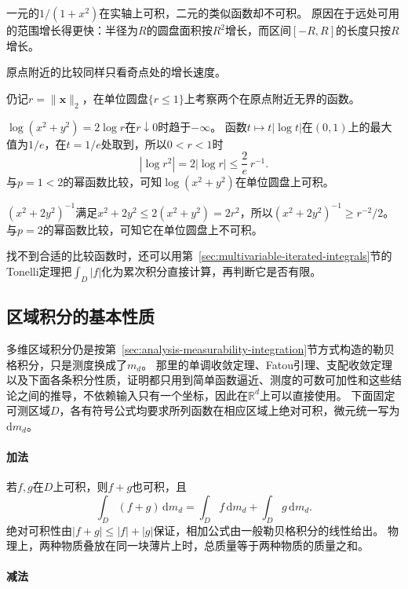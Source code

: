 一元的$1/(1+x^2)$在实轴上可积，二元的类似函数却不可积。
原因在于远处可用的范围增长得更快：半径为$R$的圆盘面积按$R^2$增长，而区间$[-R,R]$的长度只按$R$增长。

原点附近的比较同样只看奇点处的增长速度。
\begin{example}[原点附近的对数奇点与平方倒数奇点]
\label{ex:region-comparison-near-origin}
仍记$r=\lVert\bm x\rVert_2$，在单位圆盘$\{r\leq1\}$上考察两个在原点附近无界的函数。

$\log(x^2+y^2)=2\log r$在$r\downarrow0$时趋于$-\infty$。
函数$t\mapsto t|\log t|$在$(0,1)$上的最大值为$1/e$，在$t=1/e$处取到，所以$0<r<1$时
\[
 |\log r^2|=2|\log r|\leq\frac2e\,r^{-1}.
\]
与$p=1<2$的幂函数比较，可知$\log(x^2+y^2)$在单位圆盘上可积。

$(x^2+2y^2)^{-1}$满足$x^2+2y^2\leq2(x^2+y^2)=2r^2$，所以$(x^2+2y^2)^{-1}\geq r^{-2}/2$。
与$p=2$的幂函数比较，可知它在单位圆盘上不可积。
\end{example}

找不到合适的比较函数时，还可以用第~\ref{sec:multivariable-iterated-integrals}节的Tonelli定理把$\int_D|f|$化为累次积分直接计算，再判断它是否有限。

\subsection{区域积分的基本性质}

多维区域积分仍是按第~\ref{sec:analysis-measurability-integration}节方式构造的勒贝格积分，只是测度换成了$m_d$。
那里的单调收敛定理、Fatou引理、支配收敛定理以及下面各条积分性质，证明都只用到简单函数逼近、测度的可数可加性和这些结论之间的推导，不依赖输入只有一个坐标，因此在$\mathbb R^d$上可以直接使用。
下面固定可测区域$D$，各有符号公式均要求所列函数在相应区域上绝对可积，微元统一写为$\mathrm dm_d$。

\paragraph{加法}

若$f,g$在$D$上可积，则$f+g$也可积，且
\[
 \int_D(f+g)\,\mathrm dm_d=\int_Df\,\mathrm dm_d+\int_Dg\,\mathrm dm_d.
\]
绝对可积性由$|f+g|\leq|f|+|g|$保证，相加公式由一般勒贝格积分的线性给出。
物理上，两种物质叠放在同一块薄片上时，总质量等于两种物质的质量之和。

\paragraph{减法}

